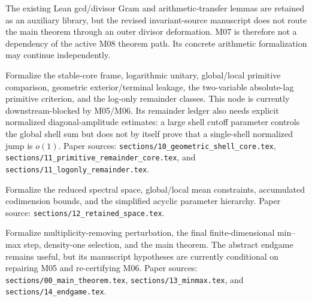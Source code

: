 \begin{definition}
\label{node:m07}
\notready
The existing Lean gcd/divisor Gram and arithmetic-transfer lemmas are retained
as an auxiliary library, but the revised invariant-source manuscript does not
route the main theorem through an outer divisor deformation.  M07 is therefore
not a dependency of the active M08 theorem path.  Its concrete arithmetic
formalization may continue independently.
\end{definition}

\begin{definition}
\label{node:m08}
\notready
{}
Formalize the stable-core frame, logarithmic unitary, global/local primitive
comparison, geometric exterior/terminal leakage, the two-variable
absolute-lag primitive criterion, and the log-only remainder classes.  This
node is currently downstream-blocked by M05/M06.  Its remainder ledger also
needs explicit normalized diagonal-amplitude estimates: a large shell cutoff
parameter controls the global shell sum but does not by itself prove that a
single-shell normalized jump is $o(1)$.  Paper sources:
\texttt{sections/10\_geometric\_shell\_core.tex},
\texttt{sections/11\_primitive\_remainder\_core.tex}, and
\texttt{sections/11\_logonly\_remainder.tex}.
\end{definition}

\begin{definition}
\label{node:m09}
\notready
{}
Formalize the reduced spectral space, global/local mean constraints,
accumulated codimension bounds, and the simplified acyclic parameter hierarchy.
Paper source: \texttt{sections/12\_retained\_space.tex}.
\end{definition}

\begin{definition}
\label{node:m10}
\notready
{}
Formalize multiplicity-removing perturbation, the final finite-dimensional
min--max step, density-one selection, and the main theorem.  The abstract
endgame remains useful, but its manuscript hypotheses are currently
conditional on repairing M05 and re-certifying M06.  Paper sources:
\texttt{sections/00\_main\_theorem.tex},
\texttt{sections/13\_minmax.tex}, and
\texttt{sections/14\_endgame.tex}.
\end{definition}
